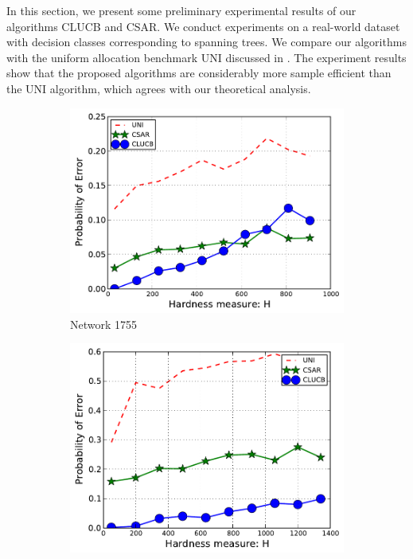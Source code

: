 \documentclass{article}
\newcommand{\Algorithm}{{\small \textsf{CLUCB}}\xspace}
\newcommand{\AlgorithmBud}{{\small \textsf{CSAR}}\xspace}
\newcommand{\Uniform}{{\small \textsf{UNI}}\xspace}
\begin{document}
In this section, we present some preliminary experimental results of our algorithms \Algorithm and \AlgorithmBud. 
We conduct experiments on a real-world dataset with decision classes corresponding to spanning trees.
We compare our algorithms with the uniform allocation benchmark \Uniform discussed in .
The experiment results show that the proposed algorithms are considerably more sample efficient than the \Uniform algorithm, which agrees with our theoretical analysis.


\newcommand{\imgsize}{0.30}
\begin{figure}[ht]
\centering
\begin{subfigure}[c]{\imgsize\textwidth}
	\includegraphics[width=\textwidth]{fig/exp/mst-c-1755}
	\caption{Network 1755}
\end{subfigure}
\begin{subfigure}[c]{\imgsize\textwidth}
	\includegraphics[width=\textwidth]{fig/exp/mst-c-3257}

\end{subfigure}
\end{figure}
\end{document}

